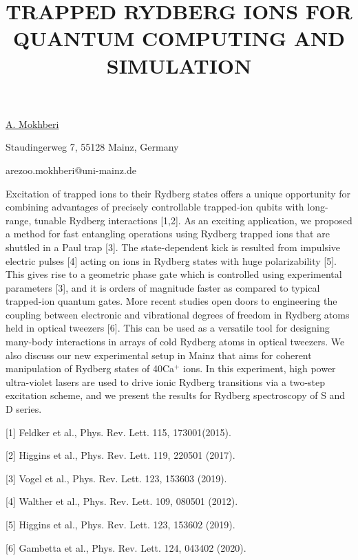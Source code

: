 \title{TRAPPED RYDBERG IONS FOR QUANTUM COMPUTING AND SIMULATION}

\underline{A. Mokhberi} 

{\normalsize{\vspace{-4mm}
Staudingerweg 7, 55128 Mainz, Germany



\email arezoo.mokhberi@uni-mainz.de}}

Excitation of trapped ions to their Rydberg states offers a unique opportunity for combining advantages of precisely controllable trapped-ion qubits with long-range, tunable Rydberg interactions [1,2]. As an exciting application, we proposed a method for fast entangling operations using Rydberg trapped ions that are shuttled in a Paul trap [3]. The state-dependent kick is resulted from impulsive electric pulses [4] acting on ions in Rydberg states with huge polarizability [5]. This gives rise to a geometric phase gate which is controlled using experimental parameters [3], and it is orders of magnitude faster as compared to typical trapped-ion quantum gates. More recent studies open doors to engineering the coupling between electronic and vibrational degrees of freedom in Rydberg atoms held in optical tweezers [6]. This can be used as a versatile tool for designing many-body interactions in arrays of cold Rydberg atoms in optical tweezers. We also discuss our new experimental setup in Mainz that aims for coherent manipulation of Rydberg states of 40Ca$^+$ ions. In this experiment, high power ultra-violet lasers are used to drive ionic Rydberg transitions via a two-step excitation scheme, and we present the results for Rydberg spectroscopy of S and D series.

{\normalsize
[1] Feldker et al., Phys. Rev. Lett. 115, 173001(2015).
\vsp

[2] Higgins et al., Phys. Rev. Lett. 119, 220501 (2017).
\vsp

[3] Vogel et al., Phys. Rev. Lett. 123, 153603 (2019).
\vsp

[4] Walther et al., Phys. Rev. Lett. 109, 080501 (2012).
\vsp

[5] Higgins et al., Phys. Rev. Lett. 123, 153602 (2019).
\vsp

[6] Gambetta et al., Phys. Rev. Lett. 124, 043402 (2020).
}

\vspace{\baselineskip}